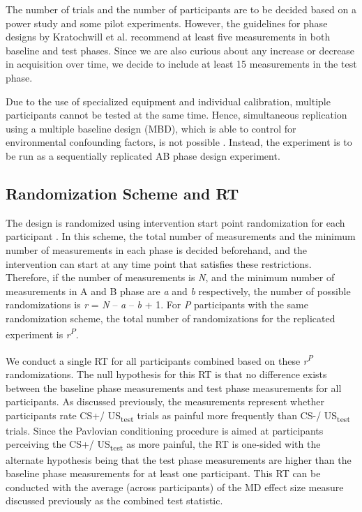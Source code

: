 \documentclass[empirical,issue, twocolumn,authordate]{jote-new-article}
\begin{document}
The number of trials and the number of participants are to be decided based on a power study and some pilot experiments. However, the guidelines for phase designs by Kratochwill et al. \parencite{Kratochwill2010a} recommend at least five measurements in both baseline and test phases. Since we are also curious about any increase or decrease in acquisition over time, we decide to include at least 15 measurements in the test phase. 

Due to the use of specialized equipment and individual calibration, multiple participants cannot be tested at the same time. Hence, simultaneous replication using a multiple baseline design (MBD), which is able to control for environmental confounding factors, is not possible \parencite{Barlow2009, Kazdin2011}. Instead, the experiment is to be run as a sequentially replicated AB phase design experiment. 

\subsection{Randomization Scheme and RT}

The design is randomized using intervention start point randomization for each participant \parencite{Edgington1975}. In this scheme, the total number of measurements and the minimum number of measurements in each phase is decided beforehand, and the intervention can start at any time point that satisfies these restrictions. Therefore, if the number of measurements is \emph{N}, and the minimum number of measurements in A and B phase are \emph{a} and \emph{b} respectively, the number of possible randomizations is \emph{r} = \emph{N} -- \emph{a} -- \emph{b} + 1. For \emph{P} participants with the same randomization scheme, the total number of randomizations for the replicated experiment is \emph{r}\textsuperscript{\emph{P}}. 

We conduct a single RT for all participants combined based on these \emph{r}\textsuperscript{\emph{P}} randomizations. The null hypothesis for this RT is that no difference exists between the baseline phase measurements and test phase measurements for all participants. As discussed previously, the measurements represent whether participants rate CS+/ US\textsubscript{test} trials as painful more frequently than CS-/ US\textsubscript{test} trials. Since the Pavlovian conditioning procedure is aimed at participants perceiving the CS+/ US\textsubscript{test} as more painful, the RT is one-sided with the alternate hypothesis being that the test phase measurements are higher than the baseline phase measurements for at least one participant. This RT can be conducted with the average (across participants) of the MD effect size measure discussed previously as the combined test statistic.
\end{document}
